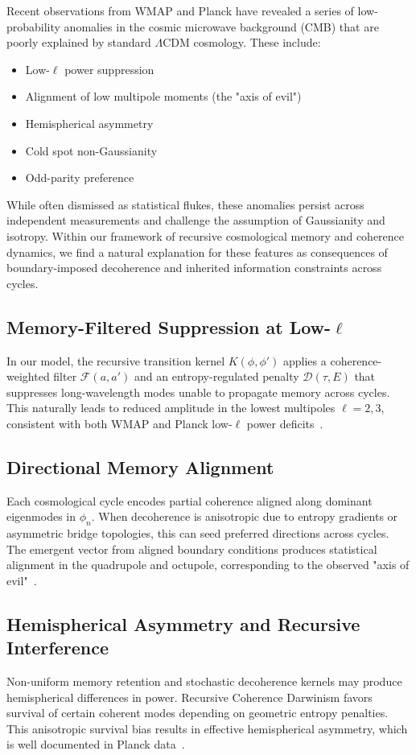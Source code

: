 Recent observations from WMAP and Planck have revealed a series of low-probability anomalies in the cosmic microwave background (CMB) that are poorly explained by standard $\Lambda$CDM cosmology. These include:

\begin{itemize}
  \item Low-$\ell$ power suppression
  \item Alignment of low multipole moments (the "axis of evil")
  \item Hemispherical asymmetry
  \item Cold spot non-Gaussianity
  \item Odd-parity preference
\end{itemize}

While often dismissed as statistical flukes, these anomalies persist across independent measurements and challenge the assumption of Gaussianity and isotropy. Within our framework of recursive cosmological memory and coherence dynamics, we find a natural explanation for these features as consequences of boundary-imposed decoherence and inherited information constraints across cycles.

\subsection*{Memory-Filtered Suppression at Low-$\ell$}
In our model, the recursive transition kernel $K(\phi, \phi')$ applies a coherence-weighted filter $\mathcal{F}(a,a')$ and an entropy-regulated penalty $\mathcal{D}(\tau,E)$ that suppresses long-wavelength modes unable to propagate memory across cycles. This naturally leads to reduced amplitude in the lowest multipoles $\ell = 2,3$, consistent with both WMAP and Planck low-$\ell$ power deficits~\cite{planck2018cmb}.

\subsection*{Directional Memory Alignment}
Each cosmological cycle encodes partial coherence aligned along dominant eigenmodes in $\phi_n$. When decoherence is anisotropic due to entropy gradients or asymmetric bridge topologies, this can seed preferred directions across cycles. The emergent vector from aligned boundary conditions produces statistical alignment in the quadrupole and octupole, corresponding to the observed "axis of evil"~\cite{land2005axis}.

\subsection*{Hemispherical Asymmetry and Recursive Interference}
Non-uniform memory retention and stochastic decoherence kernels may produce hemispherical differences in power. Recursive Coherence Darwinism favors survival of certain coherent modes depending on geometric entropy penalties. This anisotropic survival bias results in effective hemispherical asymmetry, which is well documented in Planck data~\cite{planck2018cmb, akrami2019planck}.

